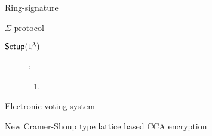 \begin{section}{Ring-signature}
\begin{subsection}{$\Sigma$-protocol}
\begin{description}
\begin{enumerate}
        \end{enumerate}

    \end{description}
  \end{subsection}
  \begin{description}
    \item[${\mathsf{Setup}}(1^{\lambda})$]:
    \begin{enumerate}
      \item
    \end{enumerate}
  \end{description}
\end{section}

\begin{section}{Electronic voting system}
\end{section}

\begin{section}{New Cramer-Shoup type lattice based CCA encryption}
\end{section}
